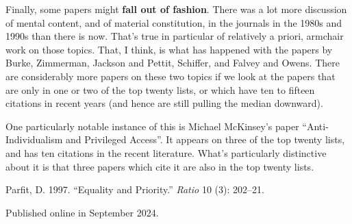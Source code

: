 \documentclass[
  10pt,
  letterpaper,
  DIV=11,
  numbers=noendperiod,
  twoside]{scrartcl}
\newlength{\cslhangindent}
\newenvironment{CSLReferences}[2] %
 {\begin{list}{}{%
  \setlength{\itemindent}{0pt}
  \setlength{\leftmargin}{0pt}
  \setlength{\parsep}{0pt}
  \ifodd #1
   \setlength{\leftmargin}{\cslhangindent}
   \setlength{\itemindent}{-1\cslhangindent}
  \fi
  \setlength{\itemsep}{#2\baselineskip}}}
 {\end{list}}
\begin{document}
Finally, some papers might \textbf{fall out of fashion}. There was a lot
more discussion of mental content, and of material constitution, in the
journals in the 1980s and 1990s than there is now. That's true in
particular of relatively a priori, armchair work on those topics. That,
I think, is what has happened with the papers by Burke, Zimmerman,
Jackson and Pettit, Schiffer, and Falvey and Owens. There are
considerably more papers on these two topics if we look at the papers
that are only in one or two of the top twenty lists, or which have ten
to fifteen citations in recent years (and hence are still pulling the
median downward).

One particularly notable instance of this is Michael McKinsey's paper
``Anti-Individualism and Privileged Access''. It appears on three of the
top twenty lists, and has ten citations in the recent literature. What's
particularly distinctive about it is that three papers which cite it are
also in the top twenty lists.

\label{refs}
\begin{CSLReferences}{1}{0}
Parfit, D. 1997. {``Equality and Priority.''} \emph{Ratio} 10 (3):
202--21.

\end{CSLReferences}



\noindent Published online in September 2024.
\end{document}
